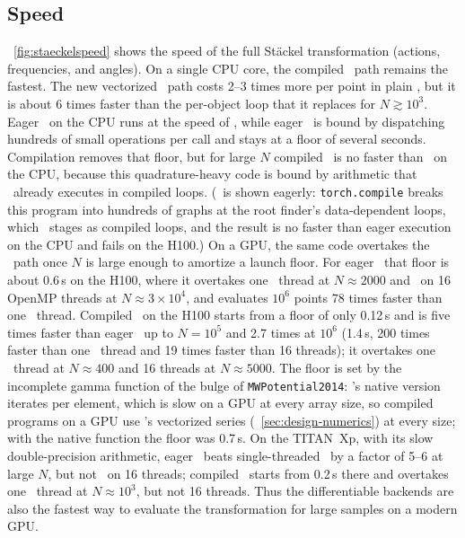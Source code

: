 \subsection{Speed}\label{sec:aa-speed}

\figurename~\ref{fig:staeckelspeed} shows the speed of the full
St\"{a}ckel transformation (actions, frequencies, and angles). On a single
CPU core, the compiled \cc\ path remains the fastest. The new vectorized
\python\ path costs 2--3 times more per point in plain \numpy, but it
is about 6 times faster than the per-object loop that it replaces for
$N\gtrsim10^3$. Eager \torch\ on the CPU runs at the speed of \numpy,
while eager \jax\ is bound by dispatching hundreds of small operations
per call and stays at a floor of several seconds. Compilation removes
that floor, but for large $N$ compiled \jax\ is no faster than \numpy\
on the CPU, because this quadrature-heavy code is bound by arithmetic
that \numpy\ already executes in compiled loops. (\torch\ is shown
eagerly: \texttt{torch.compile} breaks this program into hundreds of
graphs at the root finder's data-dependent loops, which \jax\ stages
as compiled loops, and the result is no faster than eager execution on
the CPU and fails on the H100.) On a GPU, the same
code overtakes the \cc\ path once $N$ is large enough to amortize a
launch floor. For eager \torch\ that floor is about 0.6\,s on the
H100, where it overtakes one \cc\ thread at $N\approx2000$ and \cc\
on 16 OpenMP threads at $N\approx3\times10^4$, and evaluates $10^6$
points 78 times faster than one \cc\ thread. Compiled \jax\ on the
H100 starts from a floor of only 0.12\,s and is five times faster than
eager \torch\ up to $N=10^5$ and 2.7 times at $10^6$ (1.4\,s, 200
times faster than one \cc\ thread and 19 times faster than 16
threads); it overtakes one \cc\ thread at $N\approx400$ and 16 threads
at $N\approx5000$. The floor is set by the
incomplete gamma function of the bulge of \texttt{MWPotential2014}:
\jax's native version iterates per element, which is slow on a GPU at
every array size, so compiled programs on a GPU use \galpy's vectorized
series (\sectionname~\ref{sec:design-numerics}) at every size; with the
native function the floor was 0.7\,s. On the TITAN~Xp, with its slow
double-precision arithmetic, eager \torch\ beats single-threaded \cc\
by a factor of 5--6 at large $N$, but not \cc\ on 16 threads; compiled
\jax\ starts from 0.2\,s there and overtakes one \cc\ thread at
$N\approx10^3$, but not 16 threads. Thus the differentiable backends
are also the fastest way to evaluate the transformation for large
samples on a modern GPU.

